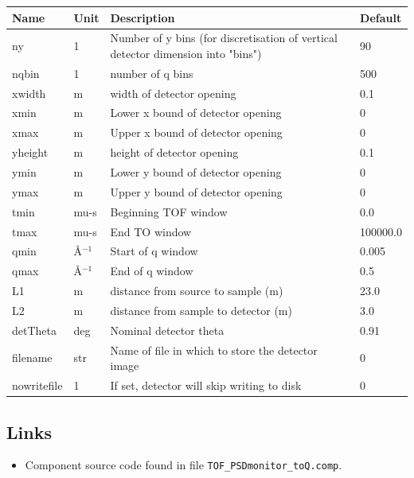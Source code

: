 \begin{longtable}{p{}p{}p{}p{}}
\toprule
\textbf{Name} & \textbf{Unit} & \textbf{Description} & \textbf{Default} \\
\midrule
\endhead
ny & 1 & Number of y bins (for discretisation of vertical detector dimension into "bins") & 90 \\
nqbin & 1 & number of q bins & 500 \\
xwidth & m & width of detector opening & 0.1 \\
xmin & m & Lower x bound of detector opening & 0 \\
xmax & m & Upper x bound of detector opening & 0 \\
yheight & m & height of detector opening & 0.1 \\
ymin & m & Lower y bound of detector opening & 0 \\
ymax & m & Upper y bound of detector opening & 0 \\
tmin & mu-s & Beginning TOF window & 0.0 \\
tmax & mu-s & End TO window & 100000.0 \\
qmin & \AA{}$^{-1}$ & Start of q window & 0.005 \\
qmax & \AA{}$^{-1}$ & End of q window & 0.5 \\
L1 & m & distance from source to sample (m) & 23.0 \\
L2 & m & distance from sample to detector (m) & 3.0 \\
detTheta & deg & Nominal detector theta & 0.91 \\
filename & str & Name of file in which to store the detector image & 0 \\
nowritefile & 1 & If set, detector will skip writing to disk & 0 \\
\bottomrule
\end{longtable}

\subsection*{Links}
\begin{itemize}
  \item Component source code found in file \texttt{TOF\_PSDmonitor\_toQ.comp}.
\end{itemize}

